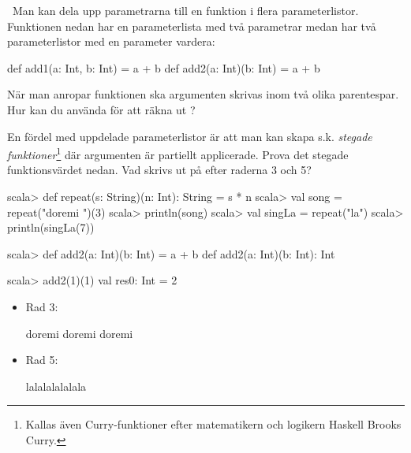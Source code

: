 \QUESTEND







\QUESTBEGIN

\Task \what~Man kan dela upp parametrarna till en funktion i flera parameterlistor. Funktionen  nedan har en parameterlista med två parametrar medan  har två parameterlistor med en parameter vardera:
\begin{Code}
  def add1(a: Int, b: Int) = a + b
  def add2(a: Int)(b: Int) = a + b
\end{Code}

\Subtask  När man anropar funktionen  ska argumenten skrivas inom två olika parentespar. Hur kan du använda  för att räkna ut ?

\Subtask En fördel med uppdelade parameterlistor är att man kan skapa s.k. \emph{stegade funktioner}\footnote{Kallas även Curry-funktioner efter matematikern och logikern Haskell Brooks Curry.} där argumenten är partiellt applicerade. Prova det stegade funktionsvärdet  nedan. Vad skrivs ut på efter raderna 3 och 5?

\begin{REPL}
scala> def repeat(s: String)(n: Int): String = s * n
scala> val song = repeat("doremi ")(3)
scala> println(song)
scala> val singLa = repeat("la")
scala> println(singLa(7))
\end{REPL}

\SOLUTION

\TaskSolved \what

\SubtaskSolved
\begin{REPL}
scala> def add2(a: Int)(b: Int) = a + b
def add2(a: Int)(b: Int): Int

scala> add2(1)(1)
val res0: Int = 2
\end{REPL}

\SubtaskSolved
\begin{itemize}

\item Rad 3:
\begin{REPLnonum}
doremi doremi doremi 
\end{REPLnonum}

\item Rad 5:
\begin{REPLnonum}
lalalalalalala
\end{REPLnonum}

\end{itemize}


